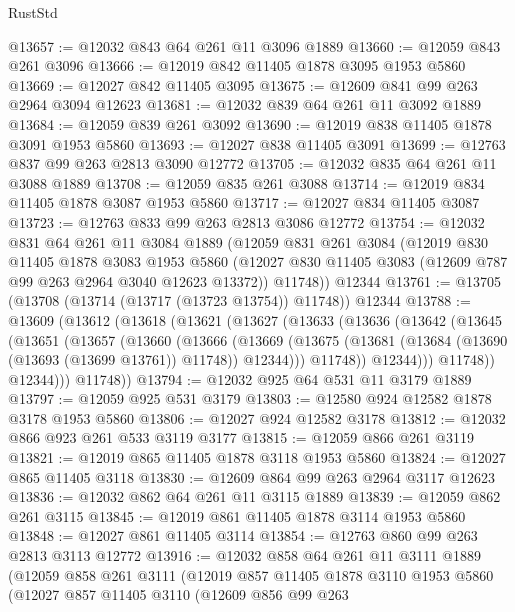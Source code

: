 \begin{lexlean}{RustStd}
\begin{coremodule}
@13657 := @12032 @843 @64 @261 @11 @3096 @1889
@13660 := @12059 @843 @261 @3096
@13666 := @12019 @842 @11405 @1878 @3095 @1953 @5860
@13669 := @12027 @842 @11405 @3095
@13675 := @12609 @841 @99 @263 @2964 @3094 @12623
@13681 := @12032 @839 @64 @261 @11 @3092 @1889
@13684 := @12059 @839 @261 @3092
@13690 := @12019 @838 @11405 @1878 @3091 @1953 @5860
@13693 := @12027 @838 @11405 @3091
@13699 := @12763 @837 @99 @263 @2813 @3090 @12772
@13705 := @12032 @835 @64 @261 @11 @3088 @1889
@13708 := @12059 @835 @261 @3088
@13714 := @12019 @834 @11405 @1878 @3087 @1953 @5860
@13717 := @12027 @834 @11405 @3087
@13723 := @12763 @833 @99 @263 @2813 @3086 @12772
@13754 := @12032
    @831
    @64
    @261
    @11
    @3084
    @1889
    (@12059
      @831
      @261
      @3084
      (@12019
        @830
        @11405
        @1878
        @3083
        @1953
        @5860
        (@12027 @830 @11405 @3083 (@12609 @787 @99 @263 @2964 @3040 @12623 @13372))
        @11748))
    @12344
@13761 := @13705 (@13708 (@13714 (@13717 (@13723 @13754)) @11748)) @12344
@13788 := @13609
    (@13612
      (@13618
        (@13621
          (@13627
            (@13633
              (@13636
                (@13642
                  (@13645
                    (@13651
                      (@13657
                        (@13660
                          (@13666
                            (@13669
                              (@13675
                                (@13681 (@13684 (@13690 (@13693 (@13699 @13761)) @11748)) @12344)))
                            @11748))
                        @12344)))
                  @11748))
              @12344)))
        @11748))
@13794 := @12032 @925 @64 @531 @11 @3179 @1889
@13797 := @12059 @925 @531 @3179
@13803 := @12580 @924 @12582 @1878 @3178 @1953 @5860
@13806 := @12027 @924 @12582 @3178
@13812 := @12032 @866 @923 @261 @533 @3119 @3177
@13815 := @12059 @866 @261 @3119
@13821 := @12019 @865 @11405 @1878 @3118 @1953 @5860
@13824 := @12027 @865 @11405 @3118
@13830 := @12609 @864 @99 @263 @2964 @3117 @12623
@13836 := @12032 @862 @64 @261 @11 @3115 @1889
@13839 := @12059 @862 @261 @3115
@13845 := @12019 @861 @11405 @1878 @3114 @1953 @5860
@13848 := @12027 @861 @11405 @3114
@13854 := @12763 @860 @99 @263 @2813 @3113 @12772
@13916 := @12032
    @858
    @64
    @261
    @11
    @3111
    @1889
    (@12059
      @858
      @261
      @3111
      (@12019
        @857
        @11405
        @1878
        @3110
        @1953
        @5860
        (@12027
          @857
          @11405
          @3110
          (@12609
            @856
            @99
            @263

\end{coremodule}
\end{lexlean}

